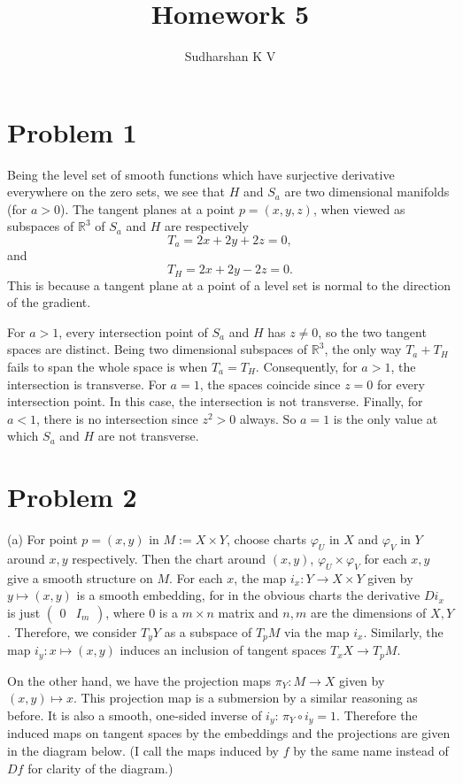\documentclass{amsart}
\title{Homework 5}
\author{Sudharshan K V}
\numberwithin{equation}{section}
\theoremstyle{plain}
\theoremstyle{definition}
\theoremstyle{remark}
\renewcommand{\_}[2]{\underbrace{#1}_{#2}}
\renewcommand{\^}[2]{\overbrace{#1}_{#2}}
\newcommand{\R}{\mathbb{R}}
\begin{document}
\maketitle

\section*{Problem 1}
Being the level set of smooth functions which have surjective derivative everywhere on the zero sets, we see that $H$ and $S_a$ are two dimensional manifolds (for $a>0$). The tangent planes at a point $p = (x,y,z)$, when viewed as subspaces of $\R^3$ of $S_a$ and $H$ are respectively \[T_a = 2x+2y+2z = 0,\] and \[T_H = 2x+2y-2z = 0.\] This is because a tangent plane at a point of a level set is normal to the direction of the gradient.

For $a>1$, every intersection point of $S_a$ and $H$ has $z\neq 0$, so the two tangent spaces are distinct. Being two dimensional subspaces of $\R^3$, the only way $T_a + T_H$ fails to span the whole space is when $T_a = T_H$. Consequently, for $a>1$, the intersection is transverse. For $a=1$, the spaces coincide since $z=0$ for every intersection point. In this case, the intersection is not transverse. Finally, for $a<1$, there is no intersection since $z^2 > 0$ always. So $a = 1$ is the only value at which $S_a$ and $H$ are not transverse. 

\section*{Problem 2}
(a) For point $p=(x,y)$ in $M:=X\times Y$, choose charts $\varphi_U$ in $X$ and $\varphi_V$ in $Y$ around $x,y$ respectively. Then the chart around $(x,y)$, $\varphi_U\times \varphi_V$ for each $x,y$ give a smooth structure on $M$. For each $x$, the map $i_x: Y\to X\times Y$ given by $y \mapsto (x,y)$ is a smooth embedding, for in the obvious charts the derivative $Di_x$ is just
$\begin{pmatrix}
  0 & I_m
 \end{pmatrix}$, where $0$ is a $m\times n$ matrix and $n,m$ are the dimensions of $X, Y$. Therefore, we consider $T_yY$ as a subspace of $T_pM$ via the map $i_x$. Similarly, the map $i_y:x\mapsto (x,y)$ induces an inclusion of tangent spaces $T_xX\to T_pM$.

 On the other hand, we have the projection maps $\pi_Y: M \to X$ given by $(x,y) \mapsto x$. This projection map is a submersion by a similar reasoning as before. It is also a smooth, one-sided inverse of $i_y$: $\pi_Y \circ i_y = 1$. Therefore the induced maps on tangent spaces by the embeddings and the projections are given in the diagram below. (I call the maps induced by $f$ by the same name instead of $Df$ for clarity of the diagram.)
\end{document}

